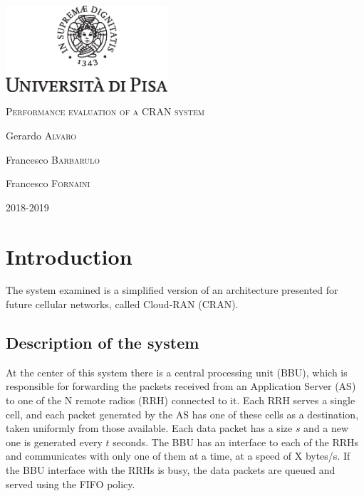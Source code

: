 \documentclass[11pt,a4paper,oneside, openright]{article}
\begin{document}
{
  \begin{titlepage}
  	\centering
  	\includegraphics[width=6cm]{images/unipi.eps}\par
  	\vspace{1.5cm}
  	{\huge\textsc{Performance evaluation of a CRAN system}\par}
  	\vspace{2cm}
  	Gerardo \textsc{Alvaro}\par
  	Francesco \textsc{Barbarulo}\par
    Francesco \textsc{Fornaini}

  	\vfill

  	{\large 2018-2019\par}
  \end{titlepage}
}


\tableofcontents

\newpage

\section{Introduction}
\label{sec:introduciton}

The system examined is a simplified version of an architecture presented for future cellular networks, called Cloud-RAN (CRAN).

\subsection{Description of the system}
 At the center of this system there is a central processing unit (BBU), which is responsible for forwarding the packets received from an Application Server (AS) to one of the N remote radios (RRH) connected to it. Each RRH serves a single cell, and each packet generated by the AS has one of these cells as a destination, taken uniformly from those available. Each data packet has a size $s$ and a new one is generated every $t$ seconds. The BBU has an interface to each of the RRHs and communicates with only one of them at a time, at a speed of X bytes/s. If the BBU interface with the RRHs is busy, the data packets are queued and served using the FIFO policy.
\end{document}
